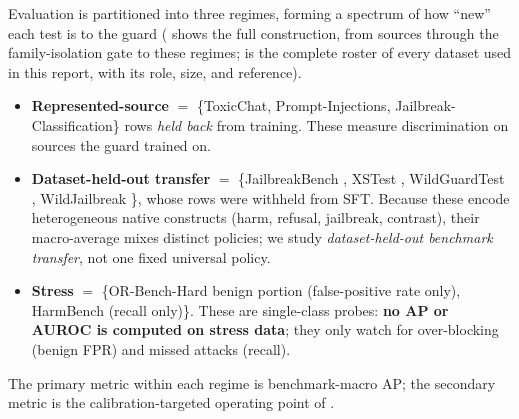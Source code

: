 Evaluation is partitioned into three regimes, forming a spectrum of how ``new'' each test is to the
guard ( shows the full construction, from sources through the family-isolation gate to
these regimes;  is the complete roster of every dataset used in this report, with its
role, size, and reference).
\begin{itemize}[leftmargin=1.4em,itemsep=1pt]
  \item \textbf{Represented-source} $=$ \{ToxicChat, Prompt-Injections, Jailbreak-Classification\} rows
  \emph{held back} from training. These measure discrimination on sources the guard trained on.
  \item \textbf{Dataset-held-out transfer} $=$ \{JailbreakBench \citep{chao2024jailbreakbench}, XSTest
  \citep{rottger2024xstest}, WildGuardTest \citep{han2024wildguard}, WildJailbreak
  \citep{jiang2024wildteaming}\}, whose rows were withheld from SFT. Because these encode heterogeneous
  native constructs (harm, refusal, jailbreak, contrast), their macro-average mixes distinct policies;
  we study \emph{dataset-held-out benchmark transfer}, not one fixed universal policy.
  \item \textbf{Stress} $=$ \{OR-Bench-Hard benign portion (false-positive rate only), HarmBench
  \citep{mazeika2024harmbench} (recall only)\}. These are single-class probes: \textbf{no AP or AUROC is
  computed on stress data}; they only watch for over-blocking (benign FPR) and missed attacks (recall).
\end{itemize}
The primary metric within each regime is benchmark-macro AP; the secondary metric is the
calibration-targeted operating point of .

